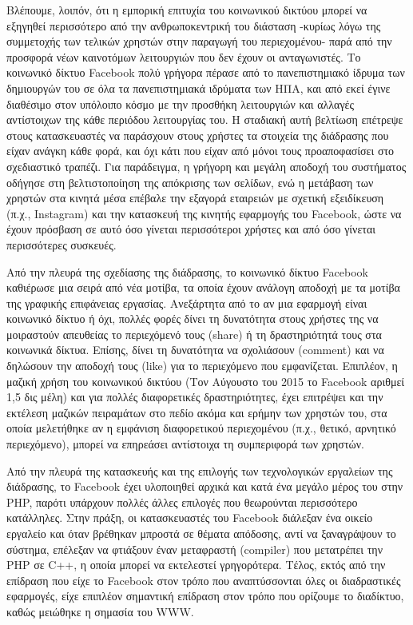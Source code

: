 \documentclass[
]{article}
\begin{document}
Βλέπουμε, λοιπόν, ότι η εμπορική επιτυχία του κοινωνικού δικτύου μπορεί
να εξηγηθεί περισσότερο από την ανθρωποκεντρική του διάσταση -κυρίως
λόγω της συμμετοχής των τελικών χρηστών στην παραγωγή του περιεχομένου-
παρά από την προσφορά νέων καινοτόμων λειτουργιών που δεν έχουν οι
ανταγωνιστές. Το κοινωνικό δίκτυο Facebook πολύ γρήγορα πέρασε από το
πανεπιστημιακό ίδρυμα των δημιουργών του σε όλα τα πανεπιστημιακά
ιδρύματα των ΗΠΑ, και από εκεί έγινε διαθέσιμο στον υπόλοιπο κόσμο με
την προσθήκη λειτουργιών και αλλαγές αντίστοιχων της κάθε περιόδου
λειτουργίας του. Η σταδιακή αυτή βελτίωση επέτρεψε στους κατασκευαστές
να παράσχουν στους χρήστες τα στοιχεία της διάδρασης που είχαν ανάγκη
κάθε φορά, και όχι κάτι που είχαν από μόνοι τους προαποφασίσει στο
σχεδιαστικό τραπέζι. Για παράδειγμα, η γρήγορη και μεγάλη αποδοχή του
συστήματος οδήγησε στη βελτιστοποίηση της απόκρισης των σελίδων, ενώ η
μετάβαση των χρηστών στα κινητά μέσα επέβαλε την εξαγορά εταιρειών με
σχετική εξειδίκευση (π.χ., Ιnstagram) και την κατασκευή της κινητής
εφαρμογής του Facebook, ώστε να έχουν πρόσβαση σε αυτό όσο γίνεται
περισσότεροι χρήστες και από όσο γίνεται περισσότερες συσκευές.

Από την πλευρά της σχεδίασης της διάδρασης, το κοινωνικό δίκτυο Facebook
καθιέρωσε μια σειρά από νέα μοτίβα, τα οποία έχουν ανάλογη αποδοχή με τα
μοτίβα της γραφικής επιφάνειας εργασίας. Ανεξάρτητα από το αν μια
εφαρμογή είναι κοινωνικό δίκτυο ή όχι, πολλές φορές δίνει τη δυνατότητα
στους χρήστες της να μοιραστούν απευθείας το περιεχόμενό τους (share) ή
τη δραστηριότητά τους στα κοινωνικά δίκτυα. Επίσης, δίνει τη δυνατότητα
να σχολιάσουν (comment) και να δηλώσουν την αποδοχή τους (like) για το
περιεχόμενο που εμφανίζεται. Επιπλέον, η μαζική χρήση του κοινωνικού
δικτύου (Τον Αύγουστο του 2015 το Facebook αριθμεί 1,5 δις μέλη) και για
πολλές διαφορετικές δραστηριότητες, έχει επιτρέψει και την εκτέλεση
μαζικών πειραμάτων στο πεδίο ακόμα και ερήμην των χρηστών του, στα οποία
μελετήθηκε αν η εμφάνιση διαφορετικού περιεχομένου (π.χ., θετικό,
αρνητικό περιεχόμενο), μπορεί να επηρεάσει αντίστοιχα τη συμπεριφορά των
χρηστών.

Από την πλευρά της κατασκευής και της επιλογής των τεχνολογικών
εργαλείων της διάδρασης, το Facebook έχει υλοποιηθεί αρχικά και κατά ένα
μεγάλο μέρος του στην PHP, παρότι υπάρχουν πολλές άλλες επιλογές που
θεωρούνται περισσότερο κατάλληλες. Στην πράξη, οι κατασκευαστές του
Facebook διάλεξαν ένα οικείο εργαλείο και όταν βρέθηκαν μπροστά σε
θέματα απόδοσης, αντί να ξαναγράψουν το σύστημα, επέλεξαν να φτιάξουν
έναν μεταφραστή (compiler) που μετατρέπει την PHP σε C++, η οποία μπορεί
να εκτελεστεί γρηγορότερα. Τέλος, εκτός από την επίδραση που είχε το
Facebook στον τρόπο που αναπτύσσονται όλες οι διαδραστικές εφαρμογές,
είχε επιπλέον σημαντική επίδραση στον τρόπο που ορίζουμε το διαδίκτυο,
καθώς μειώθηκε η σημασία του WWW.
\end{document}
